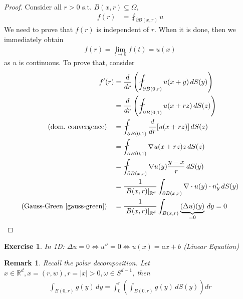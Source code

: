 \documentclass{report}
\theoremstyle{tommy}
\newtheorem{rem}[defn]{Remark}
\newtheorem{ex}[defn]{Exercise}
\begin{document}
  \begin{proof}
    Consider all \(r > 0\) s.t. \(B(x,r) \subseteq \Omega\),
    \begin{align*}
      f(r) &= \fint_{\partial B(x,r)} u
    \end{align*}
    We need to prove that \(f(r)\) is independent of \(r\). When it is done, then we immediately obtain
    \begin{align*}
      f(r) = \lim_{t \to 0} f(t) = u(x)
    \end{align*}
    as \(u\) is continuous. To prove that, consider
    \begin{align*}
      f'(r) 
      &= \frac{d}{dr} \left(\fint_{\partial B(0, r)} u(x+y) \, dS(y) \right) \\
      &= \frac{d}{dr} \left(\fint_{\partial B(0, 1)} u(x + rz) \, dS(z) \right) \\
      \text{(dom.\ convergence)} \quad & = \fint_{\partial B(0, 1)} \frac{d}{dr} [u(x + rz)] \, dS(z) \\
      &= \fint_{\partial B(0, 1)} \nabla u(x + rz) z \, dS(z) \\
      &= \fint_{\partial B(x, r)} \nabla u(y) \frac{y-x}{r} \, dS(y) \\
      &= \frac{1}{|B(x, r)|_{\mathbb{R}^d}} \int_{\partial B(x, r)} \nabla \cdot u(y) \cdot \vec{n_y} \, dS(y) \\
      \text{(Gauss-Green \ref{gauss-green})} \quad &= \frac{1}{|B(x, r)|_{\mathbb{R}^d}} \int_{B(x, r)} \underbrace{(\Delta u)(y)}_{= 0} \, dy = 0 \qedhere
    \end{align*}
  \end{proof}

  \begin{ex}
    In 1D\@: \(\Delta u = 0 \Leftrightarrow u'' = 0 \Leftrightarrow u(x) = ax + b\) (Linear Equation)
  \end{ex}

  \begin{rem}
    Recall the polar decomposition. Let \(x \in \mathbb{R}^d, x = (r,w), r = |x| > 0, \omega \in S^{d-1}\), then
    \begin{align*}
      \int_{B(0, r)} g(y) \, dy = \int_0^r \left(\int_{B(0, r)} g(y) \, dS(y) \right) dr
    \end{align*}
  \end{rem}
\end{document}
